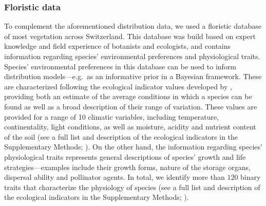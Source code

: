 \documentclass[11pt, a4paper]{article}
\begin{document}
\subsubsection*{Floristic data}
To complement the aforementioned distribution data, we used a floristic database of most vegetation across Switzerland. This database was build based on expert knowledge and field experience of botanists and ecologists, and contains information regarding species' environmental preferences and physiological traits. Species' environmental preferences in this database can be used to inform distribution models---e.g.~as an informative prior in a Bayesian framework. These are characterized following the ecological indicator values developed by \citet{landoltFloraIndicativaOkologische2010}, providing both an estimate of the average conditions in which a species can be found as well as a broad description of their range of variation. These values are provided for a range of 10 climatic variables, including temperature, continentality, light conditions, as well as moisture, acidity and nutrient content of the soil (see a full list and description of the ecological indicators in the Supplementary Methods; \citealt{landoltFloraIndicativaOkologische2010}). On the other hand, the information regarding species' physiological traits represents general descriptions of species' growth and life strategies---examples include their growth forms, nature of the storage organs, dispersal ability and pollinator agents. In total, we identify more than $120$ binary traits that characterize the physiology of species (see a full list and description of the ecological indicators in the Supplementary Methods; \citealt{landoltFloraIndicativaOkologische2010}).  


\end{document}
